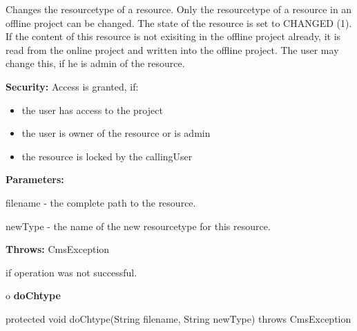 \begin{description}
\htmlDD Changes the resourcetype of a resource. \htmlBR
Only the resourcetype of a resource in an offline project can be changed. The
state of the resource is set to CHANGED (1). If the content of this resource
is not exisiting in the offline project already, it is read from the online
project and written into the offline project. The user may change this, if he
is admin of the resource.

{\bf Security:} Access is granted, if:

\begin{itemize}
\item the user has access to the project
\item the user is owner of the resource or is admin
\item the resource is locked by the callingUser
\end{itemize}

\begin{description}
\item {\bf Parameters:}

filename - the complete path to the resource.

newType - the name of the new resourcetype for this resource.
\item {\bf Throws:} CmsException

if operation was not successful.
\end{description}

\end{description}

o {\bf doChtype}

\begin{PRE}
 protected void doChtype(String filename,
                         String newType) throws CmsException
\end{PRE}

